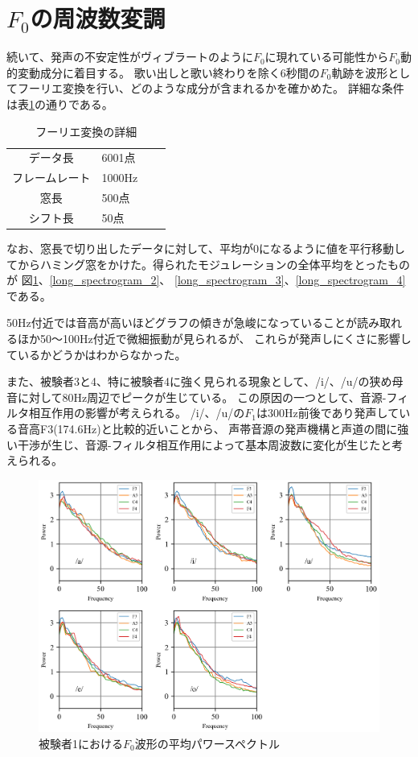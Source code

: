 \documentclass[10.5ptj,a4j,dvipdfmx,uplatex, oneside, openany, report]{jsbook}%
\begin{document}
\section{$F_0$の周波数変調}
続いて、発声の不安定性がヴィブラートのように$F_0$に現れている可能性から$F_0$動的変動成分に着目する。
歌い出しと歌い終わりを除く6秒間の$F_0$軌跡を波形としてフーリエ変換を行い、どのような成分が含まれるかを確かめた。
詳細な条件は表\ref{table:F0Moduration}の通りである。


\begin{table}[h]
    \caption{フーリエ変換の詳細}
    \label{table:F0Moduration}
    \centering
    \begin{tabular}{clll}
        \hline
        データ長 & 6001点\\
        フレームレート & 1000Hz\\
        窓長 & 500点\\
        シフト長 & 50点\\
        \hline
    \end{tabular}
\end{table}


なお、窓長で切り出したデータに対して、平均が0になるように値を平行移動してからハミング窓をかけた。得られたモジュレーションの全体平均をとったものが
図\ref{long_spectrogram_1}、\ref{long_spectrogram_2}、
\ref{long_spectrogram_3}、\ref{long_spectrogram_4}である。

50Hz付近では音高が高いほどグラフの傾きが急峻になっていることが読み取れるほか50〜100Hz付近で微細振動が見られるが、
これらが発声しにくさに影響しているかどうかはわからなかった。

また、被験者3と4、特に被験者4に強く見られる現象として、/i/、/u/の狭め母音に対して80Hz周辺でピークが生じている。
この原因の一つとして、音源-フィルタ相互作用の影響が考えられる。
/i/、/u/の$F_1$は300Hz前後であり発声している音高F3(174.6Hz)と比較的近いことから、
声帯音源の発声機構と声道の間に強い干渉が生じ\cite{source-filterCoupling}、音源-フィルタ相互作用によって基本周波数に変化が生じたと考えられる\cite{tsuburagi}。

\begin{figure}[thbp]
    \begin{center}
      \includegraphics[clip,width=12.0cm]{long_spectrogram_1.png}
      \caption{被験者1における$F_0$波形の平均パワースペクトル}
      \label{long_spectrogram_1}
    \end{center}
\end{figure}
\end{document}
